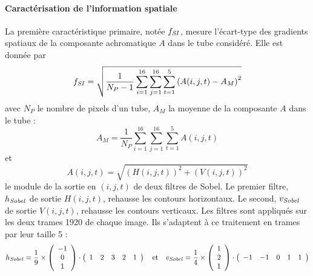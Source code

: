 \paragraph{Caractérisation de l'information spatiale}
La première caractéristique primaire, notée $f_{\mathit{SI}}$, mesure l'écart-type des gradients spatiaux de la composante achromatique $A$ dans le tube considéré. Elle est donnée par
\begin{equation}
f_{\mathit{SI}}  = \sqrt{\dfrac{1}{N_P - 1} \sum_{i=1}^{16} \sum_{j=1}^{16} \sum_{t=1}^{5} \left(A(i,j,t) - A_M\right)^2 }
\end{equation}
%
avec $N_P$ le nombre de pixels d'un tube, $A_M$ la moyenne de la composante $A$ dans le tube :
\begin{equation}
A_M = \frac{1}{N_P} \sum_{i=1}^{16} \sum_{j=1}^{16} \sum_{t=1}^{5} A(i,j,t)
\end{equation}
et
\begin{equation}
A(i,j,t) = \sqrt{\left(H(i,j,t)\right)^2 + \left(V(i,j,t)\right)^2}%
\end{equation}
%
le module de la sortie en $(i,j,t)$ de deux filtres de Sobel. Le premier filtre, $h_{\mathit{Sobel}}$ de sortie $H(i,j,t)$, rehausse les contours horizontaux. Le second, $v_{\mathit{Sobel}}$ de sortie $V(i,j,t)$, rehausse les contours verticaux. Les filtres sont appliqués sur les deux trames 1920 de chaque image. Ils s'adaptent à ce traitement en trames par leur taille 5 :
\begin{equation}
h_{\mathit{Sobel}} = \frac{1}{9} \times \left(\begin{array}{c}-1\\0\\1\\\end{array}\right) \cdot \left(\begin{array}{ccccc}1 & 2 & 3 & 2 & 1 \end{array}\right) \quad \text{et} \quad
v_{\mathit{Sobel}} = \frac{1}{4} \times \left(\begin{array}{c}1\\2\\1\\\end{array}\right) \cdot \left(\begin{array}{ccccc}-1 & -1 & 0 & 1 & 1 \end{array}\right)
\end{equation}


